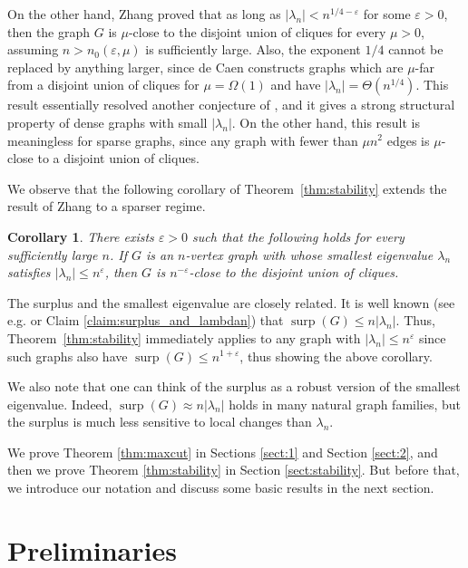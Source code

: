 \documentclass[11pt]{article}
\theoremstyle{plain}
\newtheorem{corollary}[theorem]{Corollary}
\theoremstyle{definition}
\DeclareMathOperator{\surp}{surp}
\newcommand{\eps}{\varepsilon}
\begin{document}
On the other hand, Zhang \cite{Zhang} proved that as long as $|\lambda_n|<n^{1/4-\eps}$ for some $\eps>0$, then the graph $G$ is $\mu$-close to the disjoint union of cliques for every $\mu>0$, assuming $n>n_0(\eps,\mu)$ is sufficiently large. Also, the exponent $1/4$ cannot be replaced by anything larger, since de Caen \cite{caen} constructs graphs which are $\mu$-far from a disjoint union of cliques for $\mu=\Omega(1)$ and have $|\lambda_n|=\Theta(n^{1/4})$. This result essentially resolved another conjecture of \cite{RST}, and it gives a strong structural property of dense graphs with small $|\lambda_n|$. On the other hand, this result is meaningless for sparse graphs, since any graph with fewer than $\mu n^2$ edges is $\mu$-close to a disjoint union of cliques. 

We observe that the following corollary of Theorem~\ref{thm:stability} extends the result of Zhang \cite{Zhang} to a sparser regime. 

\begin{corollary}
There exists $\eps>0$ such that the following holds for every sufficiently large $n$. If $G$ is an $n$-vertex graph with whose smallest eigenvalue $\lambda_n$ satisfies $|\lambda_n|\leq n^{\eps}$, then $G$ is $n^{-\eps}$-close to the disjoint union of cliques.
\end{corollary}

The surplus and the smallest eigenvalue are closely related. It is well known (see e.g. \cite{Zhang} or Claim \ref{claim:surplus_and_lambdan}) that $\surp(G)\leq n|\lambda_n|$. Thus, Theorem~\ref{thm:stability} immediately applies to any graph with $|\lambda_n|\leq n^{\eps}$ since such graphs also have $\surp(G)\leq n^{1+\eps}$, thus showing the above corollary.

We also note that one can think of the surplus as a robust version of the smallest eigenvalue. Indeed, $\surp(G)\approx n|\lambda_n|$ holds in many natural graph families, but the surplus is much less sensitive to local changes than $\lambda_n$.

We prove Theorem \ref{thm:maxcut} in Sections \ref{sect:1} and Section \ref{sect:2}, and then we prove Theorem \ref{thm:stability} in Section \ref{sect:stability}. But before that, we introduce our notation and discuss some basic results in the next section.

\section{Preliminaries}
\end{document}
